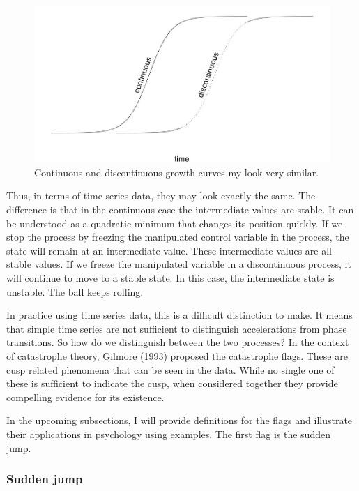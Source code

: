\documentclass[
  a4paper,
  DIV=11,
  numbers=noendperiod,
  oneside]{scrreprt}
\begin{document}
\begin{figure}

{\centering \includegraphics{media/ch3/image18.jpg}

}

\caption{\label{fig-ch3-img18-old-30}Continuous and discontinuous growth
curves my look very similar.}

\end{figure}

Thus, in terms of time series data, they may look exactly the same. The
difference is that in the continuous case the intermediate values are
stable. It can be understood as a quadratic minimum that changes its
position quickly. If we stop the process by freezing the manipulated
control variable in the process, the state will remain at an
intermediate value. These intermediate values are all stable values. If
we freeze the manipulated variable in a discontinuous process, it will
continue to move to a stable state. In this case, the intermediate state
is unstable. The ball keeps rolling.

In practice using time series data, this is a difficult distinction to
make. It means that simple time series are not sufficient to distinguish
accelerations from phase transitions. So how do we distinguish between
the two processes? In the context of catastrophe theory, Gilmore (1993)
proposed the catastrophe flags. These are cusp related phenomena that
can be seen in the data. While no single one of these is sufficient to
indicate the cusp, when considered together they provide compelling
evidence for its existence.

In the upcoming subsections, I will provide definitions for the flags
and illustrate their applications in psychology using examples. The
first flag is the sudden jump.

\hypertarget{sec-Sudden-jump}{%
\subsubsection{Sudden jump}\label{sec-Sudden-jump}}
\end{document}
